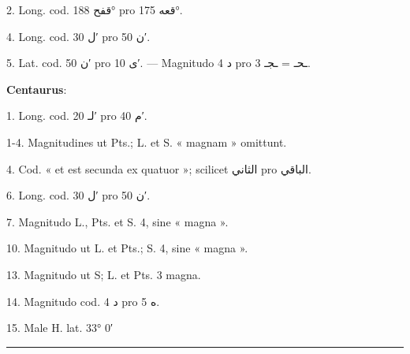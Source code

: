 \documentclass[11pt]{article}
\begin{document}
{\small
\par\hangindent=12mm 2. Long. cod. \textarabic{قفح} 188° pro \textarabic{قعه} 175°.
\par\hangindent=12mm 4. Long. cod. \textarabic{ل} 30′ pro \textarabic{ن} 50′.
\par\hangindent=12mm 5. Lat. cod. \textarabic{ن} 50′ pro \textarabic{ى} 10′. — Magnitudo \textarabic{د} 4 pro \textarabic{ـحـ} = \textarabic{ـجـ} 3.
\par\hspace*{8mm}\textbf{Centaurus}:
\par\hangindent=12mm 1. Long. cod. \textarabic{لـ} 20′ pro \textarabic{م} 40′.
\par\hangindent=12mm 1-4. Magnitudines ut Pts.; L. et S. « magnam » omittunt.
\par\hangindent=12mm 4. Cod. « et est secunda ex quatuor »; scilicet \textarabic{الثاني} pro \textarabic{الباقي}.
\par\hangindent=12mm 6. Long. cod. \textarabic{ل} 30′ pro \textarabic{ن} 50′.
\par\hangindent=12mm 7. Magnitudo L., Pts. et S. 4, sine « magna ».
\par\hangindent=12mm 10. Magnitudo ut L. et Pts.; S. 4, sine « magna ».
\par\hangindent=12mm 13. Magnitudo ut S; L. et Pts. 3 magna.
\par\hangindent=12mm 14. Magnitudo cod. \textarabic{د} 4 pro \textarabic{ه} 5.
\par\hangindent=12mm 15. Male H. lat. 33° 0′
\par}
\clearpage
\noindent{}\par\vspace{-1mm}\noindent\rule{\textwidth}{.4pt}\par\vspace{2mm}
\end{document}
